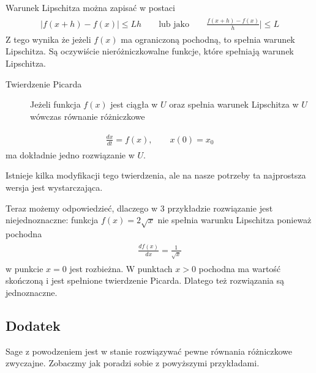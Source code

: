 \documentclass[a4paper,12pt,polish]{sphinxmanual}
\begin{document}
Warunek Lipschitza można zapisać w postaci
\label{ch1/chI012:equation-eqn9}\begin{gather}
\begin{split}|f(x+h) -f(x)| \le L h \quad \quad \mbox{lub jako} \quad \quad \frac{f(x+h) - f(x)}{h}| \le L\end{split}\label{ch1/chI012-eqn9}
\end{gather}
Z tego wynika że jeżeli  $f(x)$ ma ograniczoną pochodną, to spełnia warunek Lipschitza. Są  oczywiście nieróżniczkowalne funkcje, które spełniają warunek Lipschitza.
\begin{description}
\item[{Twierdzenie Picarda}] \leavevmode
Jeżeli funkcja $f(x)$ jest ciągła w $U$ oraz spełnia warunek Lipschitza w  $U$ wówczas równanie różniczkowe

\end{description}
\label{ch1/chI012:equation-eqn10}\begin{gather}
\begin{split}\frac{dx}{dt} = f(x), \qquad x(0) = x_0\end{split}\label{ch1/chI012-eqn10}
\end{gather}
ma dokładnie jedno rozwiązanie w $U$.

Istnieje kilka  modyfikacji tego twierdzenia, ale na nasze potrzeby ta najprostsza wersja jest wystarczająca.

Teraz możemy odpowiedzieć, dlaczego w 3 przykładzie rozwiązanie jest niejednoznaczne: funkcja $f(x) = 2\sqrt x$ nie spełnia warunku Lipschitza ponieważ pochodna
\label{ch1/chI012:equation-eqn11}\begin{gather}
\begin{split}\frac{df(x)}{dx} = \frac{1}{\sqrt x}\end{split}\label{ch1/chI012-eqn11}
\end{gather}
w punkcie $x=0$ jest rozbieżna. W punktach $x>0$  pochodna ma wartość skończoną i jest spełnione twierdzenie Picarda. Dlatego też  rozwiązania są jednoznaczne.


\subsection{Dodatek}
\label{ch1/chI012:dodatek}
Sage z powodzeniem jest w stanie rozwiązywać pewne równania różniczkowe zwyczajne. Zobaczmy jak poradzi sobie z powyższymi przykładami.
\end{document}

